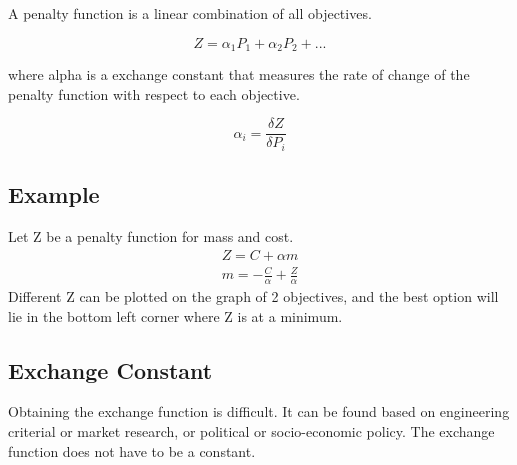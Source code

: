 \documentclass{article}
\begin{document}
        A penalty function is a linear combination of all objectives.

        \begin{equation*}
            Z = \alpha_{1} P_{1} + \alpha_{2} P_{2}+...
        \end{equation*}

        where alpha is a exchange constant that measures the rate of change of the 
        penalty function with respect to each objective.

        \begin{equation*}
            \alpha_{i} = \frac{\delta Z}{\delta P_{i}}
        \end{equation*}

        \subsection*{Example}
        Let Z be a penalty function for mass and cost.
            \begin{align*}
                Z = C + \alpha m\\
                m = -\frac{C}{\alpha} + \frac{Z}{\alpha}
            \end{align*}
        Different Z can be plotted on the graph of 2 objectives, and the best option will lie in the 
        bottom left corner where Z is at a minimum.

        \subsection*{Exchange Constant}
        Obtaining the exchange function is difficult. It can be found based on engineering criterial or 
        market research, or political or socio-economic policy. The exchange function does not have to be a constant.
        
        
\end{document}
